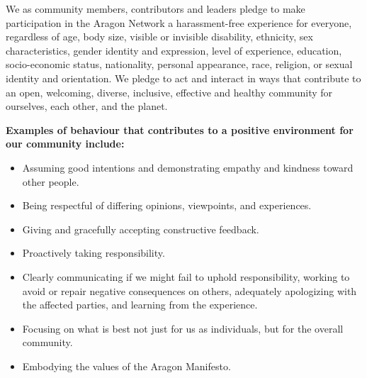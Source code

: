 
\label{chap:CommunityGuidelines}

\label{sec:CodeOfConduct}

We as community members, contributors and leaders pledge to make participation in the Aragon Network a harassment-free experience for everyone, regardless of age, body size, visible or invisible disability, ethnicity, sex characteristics, gender identity and expression, level of experience, education, socio-economic status, nationality, personal appearance, race, religion, or sexual identity and orientation.
We pledge to act and interact in ways that contribute to an open, welcoming, diverse, inclusive, effective and healthy community for ourselves, each other, and the planet.


\textbf{Examples of behaviour that contributes to a positive environment for our community include:}

\begin{itemize}
	\item Assuming good intentions and demonstrating empathy and kindness toward other people. 
	\item Being respectful of differing opinions, viewpoints, and experiences.
	\item Giving and gracefully accepting constructive feedback.
	\item Proactively taking responsibility.
	\item Clearly communicating if we might fail to uphold responsibility, working to avoid or repair negative consequences on others, adequately apologizing with the affected parties, and learning from the experience.
	\item Focusing on what is best not just for us as individuals, but for the overall community.
	\item Embodying the values of the Aragon Manifesto.
\end{itemize}

